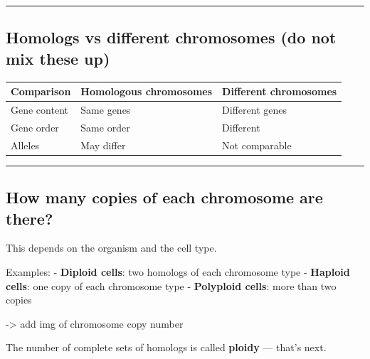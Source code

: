 \documentclass[
  letterpaper,
  DIV=11,
  numbers=noendperiod]{scrartcl}
\begin{document}
\begin{center}\rule{0.5\linewidth}{0.5pt}\end{center}

\subsection{Homologs vs different chromosomes (do not mix these
up)}\label{homologs-vs-different-chromosomes-do-not-mix-these-up}

\begin{longtable}[]{@{}lll@{}}
\toprule\noalign{}
Comparison & Homologous chromosomes & Different chromosomes \\
\midrule\noalign{}
\endhead
\bottomrule\noalign{}
\endlastfoot
Gene content & Same genes & Different genes \\
Gene order & Same order & Different \\
Alleles & May differ & Not comparable \\
\end{longtable}

\begin{center}\rule{0.5\linewidth}{0.5pt}\end{center}

\subsection{How many copies of each chromosome are
there?}\label{how-many-copies-of-each-chromosome-are-there}

This depends on the organism and the cell type.

Examples: - \textbf{Diploid cells}: two homologs of each chromosome type
- \textbf{Haploid cells}: one copy of each chromosome type -
\textbf{Polyploid cells}: more than two copies

-\textgreater{} add img of chromosome copy number

\begin{tcolorbox}[enhanced jigsaw, colframe=quarto-callout-note-color-frame, leftrule=.75mm, bottomrule=.15mm, opacitybacktitle=0.6, opacityback=0, left=2mm, rightrule=.15mm, coltitle=black, bottomtitle=1mm, titlerule=0mm, toptitle=1mm, breakable, title=\textcolor{quarto-callout-note-color}{\faInfo}\hspace{0.5em}{Preview}, colbacktitle=quarto-callout-note-color!10!white, arc=.35mm, toprule=.15mm, colback=white]

The number of complete sets of homologs is called \textbf{ploidy} ---
that's next.

\end{tcolorbox}
\end{document}
